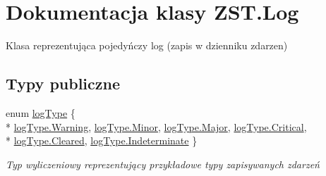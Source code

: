 \hypertarget{class_z_s_t_1_1_log}{}\section{Dokumentacja klasy Z\+S\+T.\+Log}
\label{class_z_s_t_1_1_log}


Klasa reprezentująca pojedyńczy log (zapis w dzienniku zdarzen)  


\subsection*{Typy publiczne}
\begin{DoxyCompactItemize}
\item 
enum \hyperlink{class_z_s_t_1_1_log_aefc9edf31eecb73ccb4c0ef6077b85fe}{log\+Type} \{ \\*
\hyperlink{class_z_s_t_1_1_log_aefc9edf31eecb73ccb4c0ef6077b85fea0eaadb4fcb48a0a0ed7bc9868be9fbaa}{log\+Type.\+Warning}, 
\hyperlink{class_z_s_t_1_1_log_aefc9edf31eecb73ccb4c0ef6077b85fea6fed0c378a4b4e8c1e7dc5c16dabb388}{log\+Type.\+Minor}, 
\hyperlink{class_z_s_t_1_1_log_aefc9edf31eecb73ccb4c0ef6077b85fea3b329734e45b57e60f3df64c2cf412a9}{log\+Type.\+Major}, 
\hyperlink{class_z_s_t_1_1_log_aefc9edf31eecb73ccb4c0ef6077b85fea278d01e5af56273bae1bb99a98b370cd}{log\+Type.\+Critical}, 
\\*
\hyperlink{class_z_s_t_1_1_log_aefc9edf31eecb73ccb4c0ef6077b85feaa3b087a75730395ff9ff9d3dd307295e}{log\+Type.\+Cleared}, 
\hyperlink{class_z_s_t_1_1_log_aefc9edf31eecb73ccb4c0ef6077b85feaa2d00c353d1f9a5f07852650030dbd53}{log\+Type.\+Indeterminate}
 \}
\begin{DoxyCompactList}\small\item\em Typ wyliczeniowy reprezentujący przykładowe typy zapisywanych zdarzeń \end{DoxyCompactList}\end{DoxyCompactItemize}
